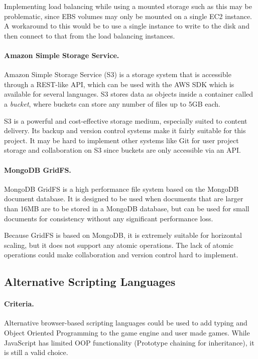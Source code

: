 Implementing load balancing while using a mounted storage such as this may be problematic, since EBS volumes may only be mounted on a single EC2 instance. A workaround to this would be to use a single instance to write to the disk and then connect to that from the load balancing instances.

\paragraph{Amazon Simple Storage Service.}
Amazon Simple Storage Service (S3) is a storage system that is accessible through a REST-like API, which can be used with the AWS SDK which is available for several languages.\cite{awss3} S3 stores data as objects inside a container called a \emph{bucket}, where buckets can store any number of files up to 5GB each.

S3 is a powerful and cost-effective storage medium, especially suited to content delivery. Its backup and version control systems make it fairly suitable for this project.\cite{awss3} It may be hard to implement other systems like Git for user project storage and collaboration on S3 since buckets are only accessible via an API.

\paragraph{MongoDB GridFS.}
MongoDB GridFS is a high performance file system based on the MongoDB document database. It is designed to be used when documents that are larger than 16MB are to be stored in a MongoDB database, but can be used for small documents for consistency without any significant performance loss.\cite{gridfs}

Because GridFS is based on MongoDB, it is extremely suitable for horizontal scaling, but it does not support any atomic operations.\cite{gridfsatomic} The lack of atomic operations could make collaboration and version control hard to implement.

\subsection{Alternative Scripting Languages}
\paragraph{Criteria.}
Alternative browser-based scripting languages could be used to add typing and Object Oriented Programming to the game engine and user made games. While JavaScript has limited OOP functionality (Prototype chaining for inheritance), it is still a valid choice.

